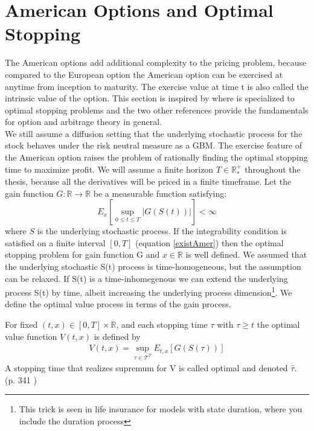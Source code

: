 
\section{American Options and Optimal Stopping}\label{AmericanOptions}
The American options add additional complexity to the pricing problem, because compared to the European option the American option can be exercised at anytime from inception to maturity. The exercise value at time t is also called the intrinsic value of the option. This section is inspired by \parencite{finKont, Shiryaev06,Elliott99} where \parencite{Shiryaev06} is specialized to optimal stopping problems and the two other references provide the fundamentals for option and arbitrage theory in general.\\

We still assume a diffusion setting that the underlying stochastic process for the stock behaves under the risk neutral measure as a GBM. The exercise feature of the American option raises the problem of rationally finding the optimal stopping time to maximize profit. We will assume a finite horizon $T\in \mathbb{R}_*^+$ throughout the thesis, because all the derivatives will be priced in a finite timeframe. Let the gain function $G:\mathbb{R}\to \mathbb{R}$ be a measurable function satisfying:
\begin{equation}\label{existAmer}
E_{x}[\sup_{0\leq t \leq T}|G(S(t))|] < \infty
\end{equation}
where $S$ is the underlying stochastic process. If the integrability condition is satisfied on a finite interval $[0,T]$ (equation \eqref{existAmer}) then the optimal stopping problem for gain function G and $x \in \mathbb{R}$ is well defined. We assumed that the underlying stochastic S(t) process is time-homogeneous, but the assumption can be relaxed. If S(t) is a time-inhomegenous we can extend the underlying process S(t) by time, albeit increasing the underlying process dimension\footnote{This trick is seen in life insurance for models with state duration, where you include the duration process}. We define the optimal value process in terms of the gain process.

\theoremstyle{definition}
\begin{definition}{}\label{optValFunc}
For fixed $(t,x)\in [0,T] \times \mathbb{R}$, and each stopping time $\tau$ with $\tau\geq t$ the optimal value function $V(t,x)$ is defined by
\begin{align}
V(t,x)= \sup_{\tau \in \mathcal{T}^T} E_{t,x}[G(S(\tau))]
\end{align}
A stopping time that realizes supremum for V is called optimal and denoted $\hat{\tau}$.
\\ \null \hfill (p. 341 \parencite{finKont})
\end{definition}

